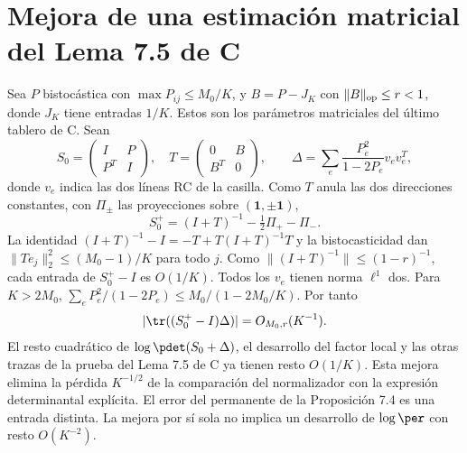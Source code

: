 \section{Mejora de una estimación matricial del Lema 7.5 de C}
Sea $P$ bistocástica con $\max P_{ij}\le M_0/K$, y $B=P-J_K$ con
$\|B\|_{\rm op}\le r<1$, donde $J_K$ tiene entradas $1/K$. Estos son los parámetros
matriciales del último tablero de C. Sean
\[
 S_0=\begin{pmatrix}I&P\\P^T&I\end{pmatrix},\quad
 T=\begin{pmatrix}0&B\\B^T&0\end{pmatrix},\qquad
 \Delta=\sum_e\frac{P_e^2}{1-2P_e}v_e v_e^T,
\]
donde $v_e$ indica las dos líneas RC de la casilla. Como $T$ anula las dos direcciones
constantes, con $\Pi_\pm$ las proyecciones sobre $(\mathbf1,\pm\mathbf1)$,
\[
 S_0^+=(I+T)^{-1}-\tfrac12\Pi_+-\Pi_- .
\]
La identidad $(I+T)^{-1}-I=-T+T(I+T)^{-1}T$ y la bistocasticidad dan
$\|Te_j\|_2^2\le (M_0-1)/K$ para todo $j$. Como
$\|(I+T)^{-1}\|\le(1-r)^{-1}$, cada entrada de $S_0^+-I$ es $O(1/K)$.
Todos los $v_e$ tienen norma $\ell^1$ dos. Para $K> 2M_0$,
$\sum_e P_e^2/(1-2P_e)\le M_0/(1-2M_0/K)$. Por tanto
\[
 |\tr((S_0^+-I)\Delta)|=O_{M_0,r}(K^{-1}).
\]
El resto cuadrático de $\log\pdet(S_0+\Delta)$, el desarrollo del factor local y las
otras trazas de la prueba del Lema 7.5 de C ya tienen resto $O(1/K)$.
Esta mejora elimina la pérdida $K^{-1/2}$ de la comparación del normalizador con
la expresión determinantal explícita. El error del permanente de la Proposición 7.4
es una entrada distinta. La mejora por sí sola no implica un desarrollo de $\log\per$
con resto $O(K^{-2})$.

